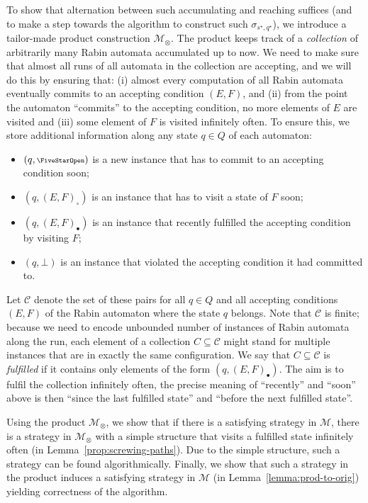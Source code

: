 \documentclass[a4paper,UKenglish]{lipics}
\newcommand{\symbopen}{\text{\scriptsize\FiveStarOpen}}
\newcommand{\mdp}{\mathcal{M}}
\newcommand{\fix}[1]{{#1^\star}}
\newcommand{\fixs}{\fix{s}}
\newcommand{\fixq}{\fix{q}}
\begin{document}
To show that alternation between such accumulating and reaching suffices (and to make a step towards the algorithm to construct such $\sigma_{\fixs,\fixq}$), we introduce a tailor-made product construction $\mdp_\otimes$. The product keeps track of a \emph{collection} of arbitrarily many Rabin automata accumulated up to now. 
We need to make sure that almost all runs of all automata in the collection are accepting, and we will do this by ensuring that:
(i) almost every computation of all Rabin automata eventually commits to an accepting condition $(E,F)$, and (ii) from the point the automaton
``commits'' to the accepting condition, no more elements of $E$ are visited and (iii) some element of $F$ is visited infinitely often.
To ensure this, we store additional information along any state $q \in Q$ of each automaton:
\begin{itemize}
	\item $(q,\symbopen)$ is a new instance that has to commit to an accepting condition soon;
	\item $(q,(E,F)_\circ)$ is an instance that has to visit a state of $F$ soon;
	\item $(q,(E,F)_\bullet)$ is an instance that recently fulfilled the accepting condition by visiting $F$;
	\item $(q,\bot)$ is an instance that violated the accepting condition it had committed to.
\end{itemize}

\noindent
Let $\mathcal{C}$ denote the set of these pairs for all $q \in Q$ and all accepting conditions $(E,F)$ of the Rabin automaton where the state $q$ belongs.
Note that $\mathcal{C}$ is finite; because we need to encode unbounded number of instances of Rabin automata along the run, each element of a collection $C \subseteq \mathcal{C}$ might stand for multiple instances that are in exactly the same configuration.
We say that $C\subseteq \mathcal{C}$ is {\em fulfilled} if it contains only elements of the form 
$(q,(E,F)_\bullet)$.
The aim is to fulfil the collection infinitely often, the precise meaning of ``recently'' and ``soon'' above is then ``since the last fulfilled state'' and ``before the next fulfilled state''. 

Using the product $\mdp_{\otimes}$, we show that if there is a satisfying strategy in $\mdp$, there is a  strategy in $\mdp_{\otimes}$ with a simple structure that visits a fulfilled state infinitely often (in Lemma~\ref{prop:screwing-paths}). Due to the simple structure, such a strategy can be found algorithmically. Finally, we show that such a strategy in the product induces a satisfying strategy in $\mdp$ (in Lemma~\ref{lemma:prod-to-orig}) yielding correctness of the algorithm.
\end{document}

